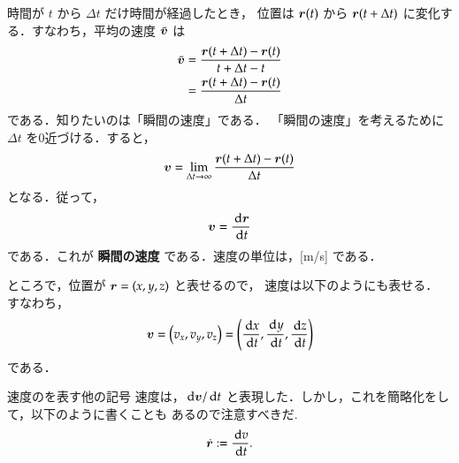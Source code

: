             時間が $t$ から $\Delta t$ だけ時間が経過したとき，
            位置は $\boldsymbol{r}(t)$ から $\boldsymbol{r}(t+\Delta t)$
            に変化する．すなわち，平均の速度 $\bar{\boldsymbol{v}}$ は
                \begin{align}
                    \bar{\boldsymbol{v}}
                    &= \frac{\boldsymbol{r}(t+\Delta t)-\boldsymbol{r}(t)}{t+\Delta t -t} \notag \\
                    &= \frac{\boldsymbol{r}(t+\Delta t)-\boldsymbol{r}(t)}{\Delta t }
                \end{align}
            である．知りたいのは「瞬間の速度」である．
            「瞬間の速度」を考えるために $\Delta t$ を0近づける．すると，
                \begin{align}
                    \boldsymbol{v}
                    = \lim_{\Delta t \to \infty}\frac{\boldsymbol{r}(t+\Delta t)
                    -\boldsymbol{r}(t)}{\Delta t} \notag \\
                \end{align}
            となる．従って，
                \begin{align}
                    \boldsymbol{v}=\frac{\,\mathrm{d} \boldsymbol{r}}{\,\mathrm{d} t}
                \end{align}
            である．これが \textbf{瞬間の速度} である．速度の単位は，[m/s] である．

            ところで，位置が $\boldsymbol{r}=(x, y, z)$ と表せるので，
            速度は以下のようにも表せる．
            すなわち，
                \begin{align}
                    \boldsymbol{v}=\left(v_{x} , v_{y} , v_{z}\right)
                       =\left(
                           \frac{\,\mathrm{d} x}{\,\mathrm{d} t},
                           \frac{\,\mathrm{d} y}{\,\mathrm{d} t},
                           \frac{\,\mathrm{d} z}{\,\mathrm{d} t}
                        \right)
                \end{align}
            である．

            \begin{memo}{速度のを表す他の記号}
            速度は，$\,\mathrm{d} \boldsymbol{v}/\,\mathrm{d} t$ と表現した．しかし，これを簡略化をして，以下のように書くことも
            あるので注意すべきだ.
                \begin{align}
                    \dot{\boldsymbol{r}} := \frac{\,\mathrm{d} \textit{\textbf{}v}}{\,\mathrm{d} t}.
                \end{align}
            \end{memo}

